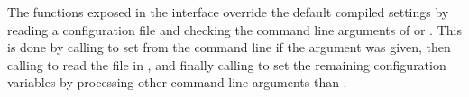 The functions exposed in the interface 
override the default compiled settings by reading a configuration file
and checking the command line arguments of  or .
This is done by calling 
to set  from the command line if the argument  was given,
then calling  to read the  file in ,
and finally calling  to set the remaining configuration variables
by processing other command line arguments than .


